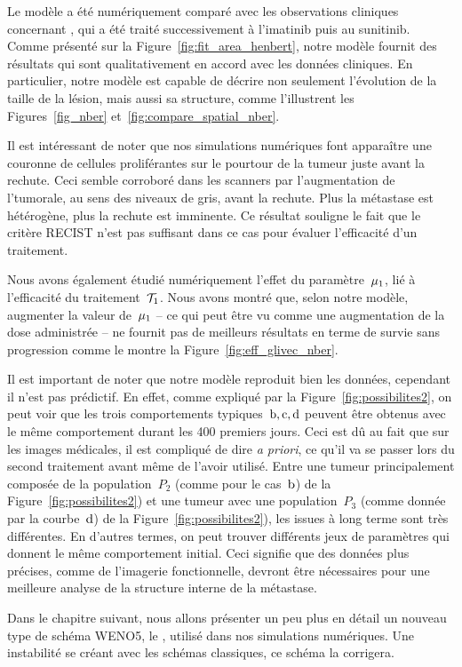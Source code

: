 \documentclass[main.tex]{subfiles}
\begin{document}
Le modèle a été numériquement comparé avec les observations cliniques concernant \Nber, qui a été traité successivement à l'imatinib puis au sunitinib.
Comme présenté sur la 
Figure~\ref{fig:fit_area_henbert}, notre modèle fournit des résultats qui sont qualitativement en accord avec les données cliniques. En particulier, notre modèle est capable de décrire non seulement l'évolution de la taille de la lésion, mais aussi sa structure, comme l'illustrent les Figures~\ref{fig_nber} et~\ref{fig:compare_spatial_nber}.

Il est intéressant de noter que nos simulations numériques font apparaître une couronne de cellules proliférantes sur le pourtour de la tumeur juste avant la rechute. Ceci semble corroboré dans les scanners par l'augmentation de l'\hetero tumorale, au sens des niveaux de gris, avant la rechute. Plus la métastase est hétérogène, plus la rechute est imminente. Ce résultat souligne le fait que le critère RECIST n'est pas suffisant dans ce cas pour évaluer l'efficacité d'un traitement.


Nous avons également étudié numériquement l'effet du paramètre~$\mu_1$, lié à l'efficacité du traitement~${\mathcal T_1}$. Nous avons montré que, selon notre modèle, augmenter la valeur de~$\mu_1$ -- ce qui peut être vu comme une augmentation de la dose administrée -- ne fournit pas de meilleurs résultats en terme de survie sans progression comme le montre la Figure~\ref{fig:eff_glivec_nber}.


Il est important de noter que notre modèle reproduit %
 bien les données, cependant il n'est pas prédictif. En effet, comme expliqué par la Figure~\ref{fig:possibilites2}, on peut voir que les trois comportements typiques~$\rm{b,c,d}$ peuvent être obtenus avec le même comportement durant les 400 premiers jours. Ceci est dû au fait que sur les images médicales, il est compliqué de dire {\it a priori}, ce qu'il va se passer lors du second traitement avant même de l'avoir utilisé. 
Entre une tumeur principalement composée de la population~$P_2$ (comme pour le cas~${\rm b}$) de la Figure~\ref{fig:possibilites2}) et une tumeur avec une population~$P_3$ (comme donnée par la courbe~${\rm d}$) de la Figure~\ref{fig:possibilites2}), les issues à long terme sont très différentes. 
En d'autres termes, on peut trouver différents jeux de paramètres qui donnent le même comportement initial. Ceci signifie que des données plus précises, comme de l'imagerie fonctionnelle, devront être nécessaires pour une meilleure analyse de la structure interne de la métastase. 




Dans le chapitre suivant, nous allons présenter un peu plus en détail un nouveau type de schéma WENO5, le \twinweno, utilisé dans nos simulations numériques. Une instabilité se créant avec les schémas classiques, ce schéma la corrigera.
\end{document}
